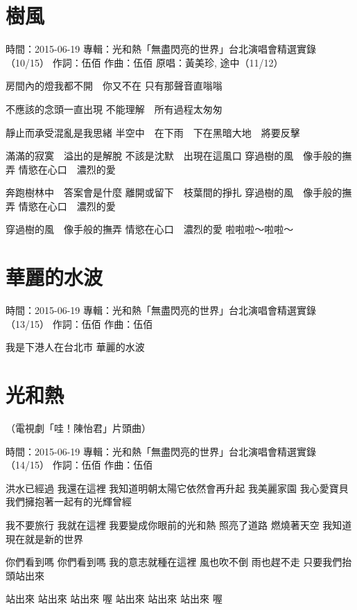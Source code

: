 \documentclass[UTF8,a4paper,oneside,twocolumn,12pt]{ctexbook}
\newcommand{\infopair}[2]{\textbullet #1：#2}
\newcommand{\zc}[1][伍佰]{\infopair{作詞}{#1}}
\newcommand{\zq}[1][伍佰]{\infopair{作曲}{#1}}
\newcommand{\zj}[1]{\infopair{專輯}{#1}}
\newcommand{\yc}[1]{\infopair{原唱}{#1}}
\newcommand{\sj}[1]{\infopair{時間}{#1}}
\newenvironment{info}{\begin{flushleft}\kaishu
	}
	{\end{flushleft}\normalsize\yahei\par}
\newenvironment{lyric}{
	}
{}
\begin{document}
\section{樹風}
\begin{info}
	\sj{2015-06-19}
	\zj{光和熱「無盡閃亮的世界」台北演唱會精選實錄（10/15）}
	\zc
	\zq
	\yc{黃美珍, 途中（11/12）}
\end{info}
\begin{lyric}
	房間內的燈我都不開　你又不在
	只有那聲音直嗡嗡

	不應該的念頭一直出現
	不能理解　所有過程太匆匆

	靜止而承受混亂是我思緒
	半空中　在下雨　下在黑暗大地　將要反擊

	滿滿的寂寞　溢出的是解脫
	不該是沈默　出現在這風口
	穿過樹的風　像手般的撫弄
	情慾在心口　濃烈的愛

	奔跑樹林中　答案會是什麼
	離開或留下　枝葉間的掙扎
	穿過樹的風　像手般的撫弄
	情慾在心口　濃烈的愛

	穿過樹的風　像手般的撫弄
	情慾在心口　濃烈的愛
	啦啦啦～啦啦～
\end{lyric}

\section{華麗的水波}
\begin{info}
	\sj{2015-06-19}
	\zj{光和熱「無盡閃亮的世界」台北演唱會精選實錄（13/15）}
	\zc
	\zq
\end{info}
\begin{lyric}
	我是下港人在台北市
	華麗的水波
\end{lyric}

\section{光和熱}
\begin{info}
	（電視劇「哇！陳怡君」片頭曲）

	\sj{2015-06-19}
	\zj{光和熱「無盡閃亮的世界」台北演唱會精選實錄（14/15）}
	\zc
	\zq
\end{info}
\begin{lyric}
	洪水已經過  我還在這裡
	我知道明朝太陽它依然會再升起
	我美麗家園  我心愛寶貝
	我們擁抱著一起有的光輝曾經

	我不要旅行  我就在這裡
	我要變成你眼前的光和熱
	照亮了道路  燃燒著天空
	我知道現在就是新的世界

	你們看到嗎   你們看到嗎
	我的意志就種在這裡
	風也吹不倒  雨也趕不走
	只要我們抬頭站出來

	站出來  站出來  站出來  喔
	站出來  站出來  站出來  喔
\end{lyric}
\end{document}
